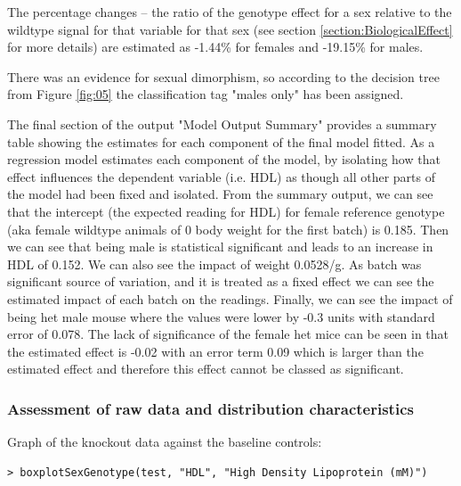 \documentclass[12pt,a4paper]{article}
\begin{document}
The percentage changes --  the ratio of the genotype effect for a sex relative to the wildtype signal for that variable for that sex (see section \ref{section:BiologicalEffect} for more details) are estimated as -1.44\% for females and -19.15\% for males.

There was an evidence for sexual dimorphism, so according to the decision tree from Figure \ref{fig:05} the classification tag "males only" has been assigned.

The final section of the output "Model Output Summary" provides a summary table showing the estimates for each component of the final model fitted. As a regression model estimates each component of the model, by isolating how that effect influences the dependent variable (i.e. HDL) as though all other parts of the model had been fixed and isolated. From the summary output, we can see that the intercept (the expected reading for HDL) for female reference genotype (aka female wildtype animals of 0 body weight for the first batch) is 0.185. Then we can see that being male is statistical significant and leads to an increase in HDL of 0.152.  We can also see the impact of weight 0.0528\//g.  As batch was significant source of variation, and it is treated as a fixed effect we can see the estimated impact of each batch on the readings.  Finally, we can see the impact of being het male mouse where the values were lower by -0.3 units with standard error of 0.078.  The lack of significance of the female het mice can be seen in that the estimated effect is -0.02 with an error term 0.09 which is larger than the estimated effect and therefore this effect cannot be classed as significant.

\subsubsection{Assessment of raw data and distribution characteristics}
Graph of the knockout data against the baseline controls:

\begingroup
\fontsize{8pt}{12pt}\selectfont
\begin{verbatim}
> boxplotSexGenotype(test, "HDL", "High Density Lipoprotein (mM)")
\end{verbatim}
\endgroup 
\end{document}
